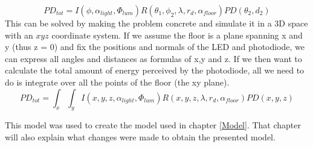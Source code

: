 \begin{equation}
	\label{eq:fullmodel}
	PD_{tot} = I(\phi,\alpha_{light},\Phi_{lum}) R(\theta_1,\phi_2,\lambda,r_d,\alpha_{floor}) PD(\theta_2,d_2)
\end{equation}
This can be solved by making the problem concrete and simulate it in a 3D space with an $xyz$ coordinate system. If we assume the floor is a plane spanning x and y (thus z = 0) and fix the positions and normals of the LED and photodiode, we can express all angles and distances as formulas of x,y and z. If we then want to calculate the total amount of energy perceived by the photodiode, all we need to do is integrate over all the points of the floor (the xy plane).
\begin{equation}
\label{eq:fullmodel_xy}
PD_{tot} = \int_x \int_y I(x,y,z,\alpha_{light},\Phi_{lum}) R(x,y,z,\lambda,r_d,\alpha_{floor}) PD(x,y,z)
\end{equation}

This model was used to create the model used in chapter \ref{Model}. That chapter will also explain what changes were made to obtain the presented model.
